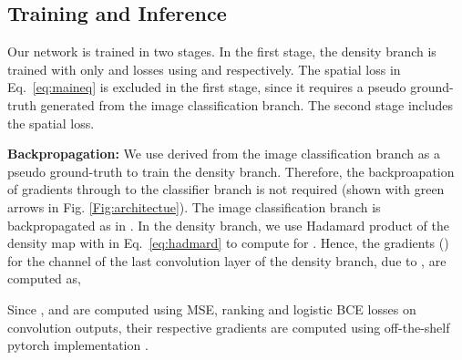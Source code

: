 \documentclass[10pt,twocolumn,letterpaper]{article}
\begin{document}
\vspace{-0.2cm}
\subsection{Training and Inference}
\vspace{-0.1cm}
\label{sec:backpropagate}
Our network is trained in two stages. In the first stage, the density branch is trained with only  and  losses using   and  respectively.  
The spatial loss  in Eq.~\ref{eq:maineq} is excluded in the first stage,  since it requires a pseudo ground-truth generated from the image classification branch.  The second stage includes the spatial loss. 


\noindent\textbf{Backpropagation:}
We use  derived from the image classification branch as a pseudo ground-truth to train the density branch. Therefore, the backproapation of gradients through  to the classifier branch is not required (shown with green arrows in Fig. \ref{Fig:architectue}).  The image classification branch is backpropagated as in \cite{PRM}. 
 In the density branch,  we use Hadamard product of the density map with   in Eq.~\ref{eq:hadmard} to compute  for .  Hence, the  gradients () for the  channel of the last convolution layer of the density branch, due to  , are  computed as, 
  \vspace{-0.1cm}

Since   ,  and    are computed using  MSE, ranking and logistic BCE losses on convolution outputs, their respective gradients  are computed using off-the-shelf pytorch implementation \cite{pytorch_cite}. 
 
\end{document}
